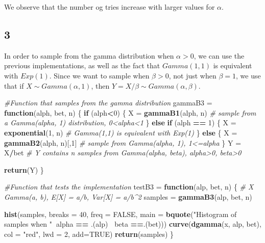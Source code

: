 \documentclass[
]{article}
\newenvironment{Shaded}{\begin{snugshade}}{\end{snugshade}}
\newcommand{\CommentTok}[1]{\textcolor[rgb]{0.56,0.35,0.01}{\textit{#1}}}
\newcommand{\ControlFlowTok}[1]{\textcolor[rgb]{0.13,0.29,0.53}{\textbf{#1}}}
\newcommand{\DataTypeTok}[1]{\textcolor[rgb]{0.13,0.29,0.53}{#1}}
\newcommand{\DecValTok}[1]{\textcolor[rgb]{0.00,0.00,0.81}{#1}}
\newcommand{\KeywordTok}[1]{\textcolor[rgb]{0.13,0.29,0.53}{\textbf{#1}}}
\newcommand{\NormalTok}[1]{#1}
\newcommand{\OperatorTok}[1]{\textcolor[rgb]{0.81,0.36,0.00}{\textbf{#1}}}
\newcommand{\OtherTok}[1]{\textcolor[rgb]{0.56,0.35,0.01}{#1}}
\newcommand{\StringTok}[1]{\textcolor[rgb]{0.31,0.60,0.02}{#1}}
\begin{document}
We observe that the number og tries increase with larger values for
\(\alpha\).

\hypertarget{section-3}{%
\subsection{3}\label{section-3}}

In order to sample from the gamma distribution when \(\alpha>0\), we can
use the previous implementations, as well as the fact that
\(Gamma(1,1)\) is equivalent with \(Exp(1)\). Since we want to sample
when \(\beta>0\), not just when \(\beta=1\), we use that if
\(X\sim Gamma(\alpha, 1)\), then \(Y=X/\beta\sim Gamma(\alpha,\beta)\).

\begin{Shaded}
\begin{Highlighting}[]
\CommentTok{#Function that samples from the gamma distribution}
\NormalTok{gammaB3 =}\StringTok{ }\ControlFlowTok{function}\NormalTok{(alph, bet, n) \{}
  \ControlFlowTok{if}\NormalTok{ (alph}\OperatorTok{<}\DecValTok{0}\NormalTok{) \{}
\NormalTok{    X =}\StringTok{ }\KeywordTok{gammaB1}\NormalTok{(alph, n) }\CommentTok{# sample from a Gamma(alpha, 1) distribution, 0<alpha<1}
\NormalTok{  \}}
  \ControlFlowTok{else} \ControlFlowTok{if}\NormalTok{ (alph }\OperatorTok{==}\StringTok{ }\DecValTok{1}\NormalTok{) \{}
\NormalTok{    X =}\StringTok{ }\KeywordTok{exponential}\NormalTok{(}\DecValTok{1}\NormalTok{, n) }\CommentTok{# Gamma(1,1) is equivalent with Exp(1)}
\NormalTok{  \}}
  \ControlFlowTok{else}\NormalTok{ \{}
\NormalTok{    X =}\StringTok{ }\KeywordTok{gammaB2}\NormalTok{(alph, n)[,}\DecValTok{1}\NormalTok{] }\CommentTok{# sample from Gamma(alpha, 1), 1<=alpha}
\NormalTok{  \}}
\NormalTok{  Y =}\StringTok{ }\NormalTok{X}\OperatorTok{/}\NormalTok{bet }\CommentTok{# Y contains n samples from Gamma(alpha, beta), alpha>0, beta>0}
  
  \KeywordTok{return}\NormalTok{(Y)}
\NormalTok{\}}

\CommentTok{#Function that tests the implementation}
\NormalTok{testB3 =}\StringTok{ }\ControlFlowTok{function}\NormalTok{(alp, bet, n) \{}
  \CommentTok{# X ~ Gamma(a, b), E[X] = a/b, Var[X] = a/b^2}
\NormalTok{  samples =}\StringTok{ }\KeywordTok{gammaB3}\NormalTok{(alp, bet, n)}
  
  \KeywordTok{hist}\NormalTok{(samples, }\DataTypeTok{breaks =} \DecValTok{40}\NormalTok{, }\DataTypeTok{freq =} \OtherTok{FALSE}\NormalTok{, }\DataTypeTok{main =} \KeywordTok{bquote}\NormalTok{(}\StringTok{"Histogram of samples when "}\OperatorTok{~}\NormalTok{alpha }\OperatorTok{==}\StringTok{ }\NormalTok{.(alp) }\OperatorTok{~}\NormalTok{beta }\OperatorTok{==}\NormalTok{.(bet)))}
  \KeywordTok{curve}\NormalTok{(}\KeywordTok{dgamma}\NormalTok{(x, alp, bet), }\DataTypeTok{col =} \StringTok{"red"}\NormalTok{, }\DataTypeTok{lwd =} \DecValTok{2}\NormalTok{, }\DataTypeTok{add=}\OtherTok{TRUE}\NormalTok{)}
  \KeywordTok{return}\NormalTok{(samples)}
\NormalTok{\}}


\end{Highlighting}
\end{Shaded}
\end{document}
